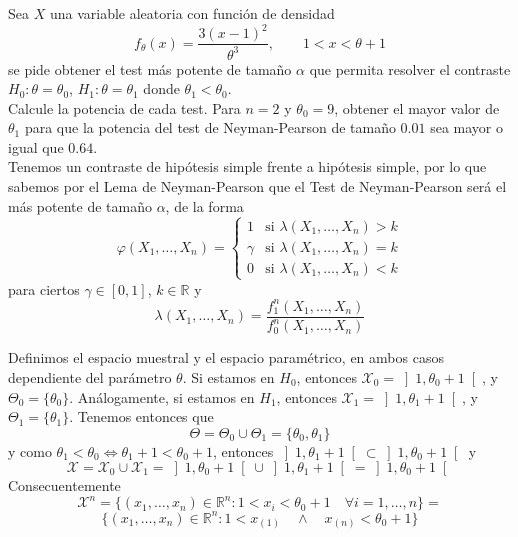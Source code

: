 \documentclass[12pt]{article}
\newcommand{\R}{\mathbb{R}}
\newcommand{\X}{\mathcal{X}}
\begin{document}
    \newpage

    \begin{ejercicio}[2 puntos]
        Sea $X$ una variable aleatoria con función de densidad
        \begin{equation*}
            f_\theta(x) = \frac{3{(x-1)}^{2}}{\theta^3}, \qquad 1<x<\theta +1
        \end{equation*}
        se pide obtener el test más potente de tamaño $\alpha$ que permita resolver el contraste $H_0:\theta = \theta_0$, $H_1:\theta=\theta_1$ donde $\theta_1<\theta_0$.\\

        \noindent
        Calcule la potencia de cada test. Para $n=2$ y $\theta_0=9$, obtener el mayor valor de $\theta_1$ para que la potencia del test de Neyman-Pearson de tamaño $0.01$ sea mayor o igual que $0.64$. \\

        Tenemos un contraste de hipótesis simple frente a hipótesis simple, por lo que sabemos por el Lema de Neyman-Pearson que el 
        Test de Neyman-Pearson será el más potente de tamaño $\alpha$, de la forma
        $$\varphi(X_1, \ldots, X_n) = \begin{cases}
            1 &\text{si } \lambda(X_1, \ldots, X_n) > k \\
            \gamma &\text{si } \lambda(X_1, \ldots, X_n) = k \\
            0 &\text{si } \lambda(X_1, \ldots, X_n) < k
        \end{cases}$$
        para ciertos $\gamma \in [0,1]$, $k \in \R$ y 
        $$\lambda(X_1, \ldots, X_n) = \dfrac{f_1^n(X_1, \ldots, X_n)}{f_0^n(X_1, \ldots, X_n)}$$

        Definimos el espacio muestral y el espacio paramétrico, en ambos casos dependiente del parámetro
        $\theta$. Si estamos en $H_0$, entonces $\X_0 = \left]1, \theta_0 + 1 \right[$, y $\Theta_0 = 
        \{\theta_0\}$. Análogamente, si estamos en $H_1$, entonces $\X_1 = \left]1, \theta_1 + 1 \right[$, y $\Theta_1 = 
        \{\theta_1\}$. Tenemos entonces que $$\Theta = \Theta_0 \cup \Theta_1 = \{\theta_0, \theta_1\}$$ y como
        $\theta_1 < \theta_0 \iff \theta_1 + 1 < \theta_0 + 1$, entonces $\left]1, \theta_1 + 1 \right[ \subset \left]1, \theta_0 + 1 \right[$ y
        $$\X = \X_0 \cup \X_1 = \left]1, \theta_0 + 1 \right[ \cup \left]1, \theta_1 + 1 \right[ = \left]1, \theta_0 + 1 \right[$$
        Consecuentemente $$\X^n = \{(x_1, \ldots, x_n) \in \R^n : 1 < x_i < \theta_0 + 1 \quad \forall i = 1, \ldots, n\} = $$
        $$\{(x_1, \ldots, x_n) \in \R^n : 1 < x_{(1)} \quad \land \quad x_{(n)} < \theta_0 + 1\}$$


\end{ejercicio}
\end{document}
